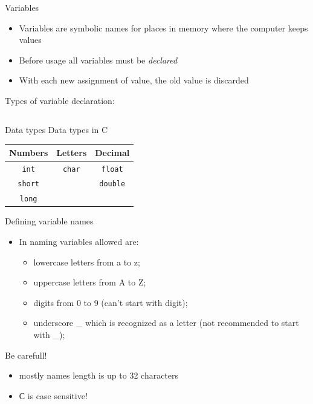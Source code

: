 \begin{frame}{Variables}
\begin{itemize}
\item Variables are symbolic names for places in memory where the
computer keeps values
\item Before usage all variables must be \emph{declared}
\item With each new assignment of value, the old value is discarded
\end{itemize}

Types of variable declaration:
\linebreak
\begin{columns}
         
         
         \fbox{ = }
         
         \fbox{ ; }
\end{columns}   

\end{frame}

\begin{frame}{Data types}
\Large{Data types in C}
\linebreak
\linebreak
\begin{tabular}{c|c|c}
\textbf{Numbers} & \textbf{Letters} & \textbf{Decimal}\\
\hline
\texttt{int} & \texttt{char} & \texttt{float} \\
\hline
\texttt{short} & & \texttt{double} \\
\hline
\texttt{long} & &
\end{tabular}
\end{frame}

\begin{frame}{Defining variable names}
\begin{itemize}
\item In naming variables allowed are:
\begin{itemize}
\item lowercase letters from a to z;
\item uppercase letters from A to Z;
\item digits from 0 to 9 (can't start with digit);
\item underscore \_ which is recognized as a letter (not recommended to start
with \_);
\end{itemize}
\end{itemize}
\begin{alertblock}{Be carefull!}
\begin{itemize}
\item mostly names length is up to 32 characters
\item С is case sensitive!
\end{itemize}
\end{alertblock}
\end{frame}

